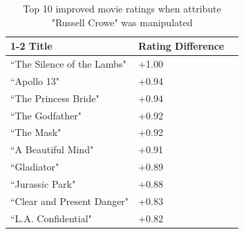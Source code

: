 \begin{table}[h!]
    \centering
    \caption{Top 10 improved movie ratings when attribute "Russell Crowe" was manipulated}
    \label{tab:crowe}
    \begin{tabular}{llr}    
        \toprule
        \cmidrule(r){1-2}
        Title & Rating Difference \\
        \midrule
        ``The Silence of the Lambs" & +1.00\\
        ``Apollo 13" & +0.94\\
        ``The Princess Bride" & +0.94\\
        ``The Godfather" & +0.92\\
        ``The Mask" & +0.92\\
        ``A Beautiful Mind" & +0.91\\
        ``Gladiator" & +0.89\\
        ``Jurassic Park" & +0.88\\
        ``Clear and Present Danger" & +0.83\\
        ``L.A. Confidential" & +0.82\\
        \bottomrule
    \end{tabular}
\end{table}